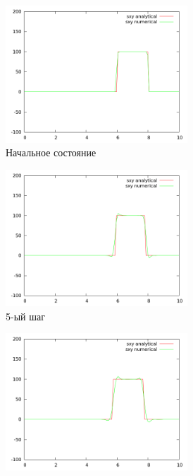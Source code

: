 \begin{figure}[H]
\begin{subfigure}[b]{0.5\textwidth}
\centering
\includegraphics[width=0.75\textwidth]{png/veryfication/0.2/s-wave-along-x0.png}
\caption{Начальное состояние}
\end{subfigure}
\begin{subfigure}[b]{0.5\textwidth}
\centering
\includegraphics[width=0.75\textwidth]{png/veryfication/0.2/s-wave-along-x5.png}
\caption{5-ый шаг}
\end{subfigure}
\begin{subfigure}[b]{0.5\textwidth}
\centering
\includegraphics[width=0.75\textwidth]{png/veryfication/0.2/s-wave-along-x10.png}

\end{subfigure}
\end{figure}
